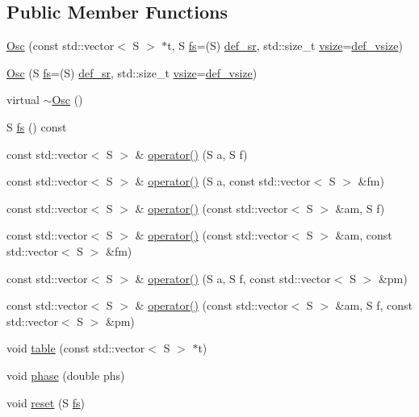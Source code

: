 \subsection*{Public Member Functions}
\begin{DoxyCompactItemize}
\item 
\hyperlink{class_aurora_1_1_osc_aa0ff8c343d8e8c0503ed00445d504348}{Osc} (const std\+::vector$<$ S $>$ $\ast$t, S \hyperlink{class_aurora_1_1_osc_a10d968f92bf489112dd990c15cda6780}{fs}=(S) \hyperlink{namespace_aurora_ad49263d809bea98dd422e95bc91bc03e}{def\+\_\+sr}, std\+::size\+\_\+t \hyperlink{class_aurora_1_1_snd_base_af9e21aaf411b17f7a8221c991ce5d291}{vsize}=\hyperlink{namespace_aurora_afaaddf667a06e7ce23c667a8b7295263}{def\+\_\+vsize})
\item 
\hyperlink{class_aurora_1_1_osc_a696356c8638245c8c924adc2bfdc1d0e}{Osc} (S \hyperlink{class_aurora_1_1_osc_a10d968f92bf489112dd990c15cda6780}{fs}=(S) \hyperlink{namespace_aurora_ad49263d809bea98dd422e95bc91bc03e}{def\+\_\+sr}, std\+::size\+\_\+t \hyperlink{class_aurora_1_1_snd_base_af9e21aaf411b17f7a8221c991ce5d291}{vsize}=\hyperlink{namespace_aurora_afaaddf667a06e7ce23c667a8b7295263}{def\+\_\+vsize})
\item 
virtual \hyperlink{class_aurora_1_1_osc_a1c8857130cdc3f61acd835d3725df831}{$\sim$\+Osc} ()
\item 
S \hyperlink{class_aurora_1_1_osc_a10d968f92bf489112dd990c15cda6780}{fs} () const
\item 
const std\+::vector$<$ S $>$ \& \hyperlink{class_aurora_1_1_osc_ae468eb608399c463e0b862ea08a1882c}{operator()} (S a, S f)
\item 
const std\+::vector$<$ S $>$ \& \hyperlink{class_aurora_1_1_osc_abeee979869e6605f9ace573a499ec152}{operator()} (S a, const std\+::vector$<$ S $>$ \&fm)
\item 
const std\+::vector$<$ S $>$ \& \hyperlink{class_aurora_1_1_osc_af0e68ce0f58f3cf4bf49d20f1a1e5e81}{operator()} (const std\+::vector$<$ S $>$ \&am, S f)
\item 
const std\+::vector$<$ S $>$ \& \hyperlink{class_aurora_1_1_osc_a5f0d9cf3393f173b810b7049ea2807ac}{operator()} (const std\+::vector$<$ S $>$ \&am, const std\+::vector$<$ S $>$ \&fm)
\item 
const std\+::vector$<$ S $>$ \& \hyperlink{class_aurora_1_1_osc_abbef8b0aacfbc3cac66f25b774bd3a84}{operator()} (S a, S f, const std\+::vector$<$ S $>$ \&pm)
\item 
const std\+::vector$<$ S $>$ \& \hyperlink{class_aurora_1_1_osc_a6a339a71db41fbbd944dd603c986b81d}{operator()} (const std\+::vector$<$ S $>$ \&am, S f, const std\+::vector$<$ S $>$ \&pm)
\item 
void \hyperlink{class_aurora_1_1_osc_af003fa84004e878179446ceaf2d0007c}{table} (const std\+::vector$<$ S $>$ $\ast$t)
\item 
void \hyperlink{class_aurora_1_1_osc_a93770f94cde427c999be8a7b6c8a1cc9}{phase} (double phs)
\item 
void \hyperlink{class_aurora_1_1_osc_a9537710c678ff70707c340343534ac58}{reset} (S \hyperlink{class_aurora_1_1_osc_a10d968f92bf489112dd990c15cda6780}{fs})
\end{DoxyCompactItemize}


